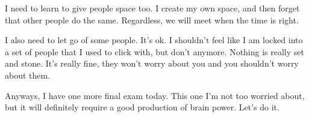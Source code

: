 \documentclass[12pt]{article}
\theoremstyle{definition} %
\theoremstyle{plain} %
\begin{document}
I need to learn to give people space too. I create my own space, and then forget that other people do the same. Regardless, we will meet when the time is right. 

I also need to let go of some people. It's ok. I shouldn't feel like I am locked into a set of people that I used to click with, but don't anymore. Nothing is really set and stone. It's really fine, they won't worry about you and you shouldn't worry about them. 

Anyways, I have one more final exam today. This one I'm not too worried about, but it will definitely require a good production of brain power. Let's do it.
\end{document}
